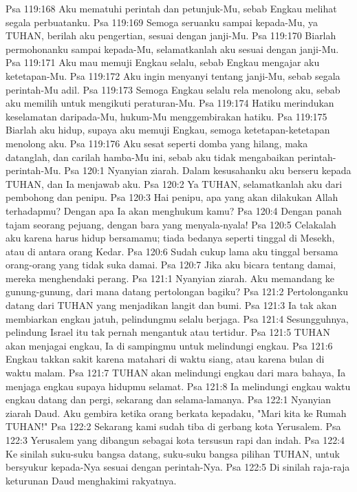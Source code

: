 Psa 119:168  Aku mematuhi perintah dan petunjuk-Mu, sebab Engkau melihat segala perbuatanku.
Psa 119:169  Semoga seruanku sampai kepada-Mu, ya TUHAN, berilah aku pengertian, sesuai dengan janji-Mu.
Psa 119:170  Biarlah permohonanku sampai kepada-Mu, selamatkanlah aku sesuai dengan janji-Mu.
Psa 119:171  Aku mau memuji Engkau selalu, sebab Engkau mengajar aku ketetapan-Mu.
Psa 119:172  Aku ingin menyanyi tentang janji-Mu, sebab segala perintah-Mu adil.
Psa 119:173  Semoga Engkau selalu rela menolong aku, sebab aku memilih untuk mengikuti peraturan-Mu.
Psa 119:174  Hatiku merindukan keselamatan daripada-Mu, hukum-Mu menggembirakan hatiku.
Psa 119:175  Biarlah aku hidup, supaya aku memuji Engkau, semoga ketetapan-ketetapan menolong aku.
Psa 119:176  Aku sesat seperti domba yang hilang, maka datanglah, dan carilah hamba-Mu ini, sebab aku tidak mengabaikan perintah-perintah-Mu.
Psa 120:1  Nyanyian ziarah. Dalam kesusahanku aku berseru kepada TUHAN, dan Ia menjawab aku.
Psa 120:2  Ya TUHAN, selamatkanlah aku dari pembohong dan penipu.
Psa 120:3  Hai penipu, apa yang akan dilakukan Allah terhadapmu? Dengan apa Ia akan menghukum kamu?
Psa 120:4  Dengan panah tajam seorang pejuang, dengan bara yang menyala-nyala!
Psa 120:5  Celakalah aku karena harus hidup bersamamu; tiada bedanya seperti tinggal di Mesekh, atau di antara orang Kedar.
Psa 120:6  Sudah cukup lama aku tinggal bersama orang-orang yang tidak suka damai.
Psa 120:7  Jika aku bicara tentang damai, mereka menghendaki perang.
Psa 121:1  Nyanyian ziarah. Aku memandang ke gunung-gunung, dari mana datang pertolongan bagiku?
Psa 121:2  Pertolonganku datang dari TUHAN yang menjadikan langit dan bumi.
Psa 121:3  Ia tak akan membiarkan engkau jatuh, pelindungmu selalu berjaga.
Psa 121:4  Sesungguhnya, pelindung Israel itu tak pernah mengantuk atau tertidur.
Psa 121:5  TUHAN akan menjagai engkau, Ia di sampingmu untuk melindungi engkau.
Psa 121:6  Engkau takkan sakit karena matahari di waktu siang, atau karena bulan di waktu malam.
Psa 121:7  TUHAN akan melindungi engkau dari mara bahaya, Ia menjaga engkau supaya hidupmu selamat.
Psa 121:8  Ia melindungi engkau waktu engkau datang dan pergi, sekarang dan selama-lamanya.
Psa 122:1  Nyanyian ziarah Daud. Aku gembira ketika orang berkata kepadaku, "Mari kita ke Rumah TUHAN!"
Psa 122:2  Sekarang kami sudah tiba di gerbang kota Yerusalem.
Psa 122:3  Yerusalem yang dibangun sebagai kota tersusun rapi dan indah.
Psa 122:4  Ke sinilah suku-suku bangsa datang, suku-suku bangsa pilihan TUHAN, untuk bersyukur kepada-Nya sesuai dengan perintah-Nya.
Psa 122:5  Di sinilah raja-raja keturunan Daud menghakimi rakyatnya.
